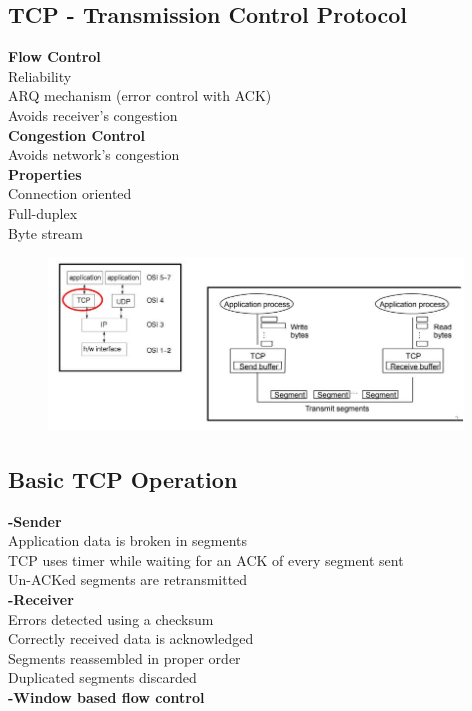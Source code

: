 \documentclass[../resumosRCOM.tex]{subfiles}
\begin{document}
\subsection{TCP - Transmission Control Protocol}
\textbf{Flow Control}\\
Reliability\\
ARQ mechanism (error control with ACK)\\
Avoids receiver's congestion\\
\textbf{Congestion Control}\\
Avoids network's congestion\\
\textbf{Properties}\\
Connection oriented\\
Full-duplex\\
Byte stream\\
\begin{figure}[h]
    \centering
    \includegraphics[width=11cm]{images/trans5.JPG}
\end{figure}

\subsection{Basic TCP Operation}
\textbf{-Sender}\\
Application data is broken in segments\\
TCP uses timer while waiting for an ACK of every segment sent\\
Un-ACKed segments are retransmitted\\
\textbf{-Receiver}\\
Errors detected using a checksum\\
Correctly received data is acknowledged\\
Segments reassembled in proper order\\
Duplicated segments discarded\\
\textbf{-Window based flow control}
\end{document}
